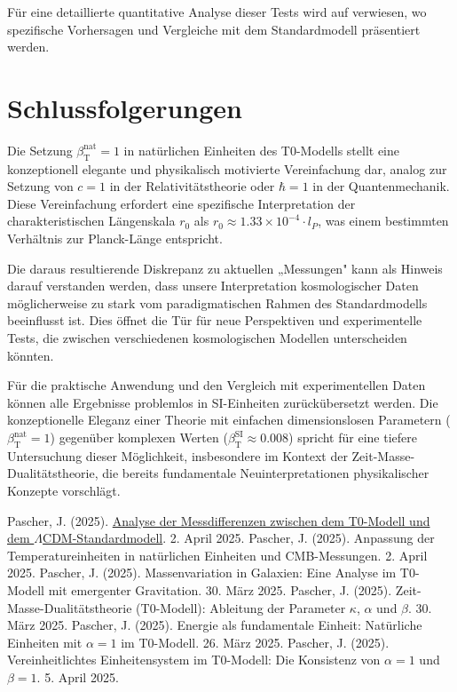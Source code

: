 \documentclass[12pt,a4paper]{article}
\newcommand{\betaT}{\beta_{\text{T}}}
\begin{document}
	Für eine detaillierte quantitative Analyse dieser Tests wird auf \cite{pascher_alphabeta_2025} verwiesen, wo spezifische Vorhersagen und Vergleiche mit dem Standardmodell präsentiert werden.
	
	\section{Schlussfolgerungen}
	
	Die Setzung \(\betaT^{\text{nat}} = 1\) in natürlichen Einheiten des T0-Modells stellt eine konzeptionell elegante und physikalisch motivierte Vereinfachung dar, analog zur Setzung von \(c = 1\) in der Relativitätstheorie oder \(\hbar = 1\) in der Quantenmechanik. Diese Vereinfachung erfordert eine spezifische Interpretation der charakteristischen Längenskala \(r_0\) als \(r_0 \approx 1.33 \times 10^{-4} \cdot l_P\), was einem bestimmten Verhältnis zur Planck-Länge entspricht.
	
	Die daraus resultierende Diskrepanz zu aktuellen „Messungen" kann als Hinweis darauf verstanden werden, dass unsere Interpretation kosmologischer Daten möglicherweise zu stark vom paradigmatischen Rahmen des Standardmodells beeinflusst ist. Dies öffnet die Tür für neue Perspektiven und experimentelle Tests, die zwischen verschiedenen kosmologischen Modellen unterscheiden könnten.
	
	Für die praktische Anwendung und den Vergleich mit experimentellen Daten können alle Ergebnisse problemlos in SI-Einheiten zurückübersetzt werden. Die konzeptionelle Eleganz einer Theorie mit einfachen dimensionslosen Parametern (\(\betaT^{\text{nat}} = 1\)) gegenüber komplexen Werten (\(\betaT^{\text{SI}} \approx 0.008\)) spricht für eine tiefere Untersuchung dieser Möglichkeit, insbesondere im Kontext der Zeit-Masse-Dualitätstheorie, die bereits fundamentale Neuinterpretationen physikalischer Konzepte vorschlägt.
	
	\begin{thebibliography}{99}
		 Pascher, J. (2025). \href{https://github.com/jpascher/T0-Time-Mass-Duality/tree/main/2/pdf/Deutsch/Analyse der Messdifferenzen zwischen dem T0-Modell und dem Standardmodell.pdf}{Analyse der Messdifferenzen zwischen dem T0-Modell und dem \(\Lambda\)CDM-Standardmodell}. 2. April 2025.
		 Pascher, J. (2025). Anpassung der Temperatureinheiten in natürlichen Einheiten und CMB-Messungen. 2. April 2025.
		 Pascher, J. (2025). Massenvariation in Galaxien: Eine Analyse im T0-Modell mit emergenter Gravitation. 30. März 2025.
		 Pascher, J. (2025). Zeit-Masse-Dualitätstheorie (T0-Modell): Ableitung der Parameter \(\kappa\), \(\alpha\) und \(\beta\). 30. März 2025.
		 Pascher, J. (2025). Energie als fundamentale Einheit: Natürliche Einheiten mit \(\alpha = 1\) im T0-Modell. 26. März 2025.
		 Pascher, J. (2025). Vereinheitlichtes Einheitensystem im T0-Modell: Die Konsistenz von \(\alpha = 1\) und \(\beta = 1\). 5. April 2025.
	\end{thebibliography}
	
\end{document}
